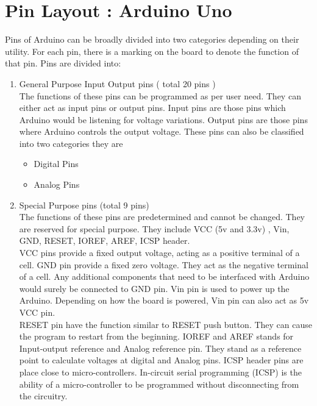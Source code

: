 \section{Pin Layout : Arduino Uno}
\par Pins of Arduino can be broadly divided into two categories depending on their utility. For each pin, there is a marking on the board to denote the function of that pin. Pins are divided into:
\begin{enumerate}
    \item General Purpose Input Output pins ( total 20 pins ) \vspace{1.5mm} \\ 
    The functions of these pins can be programmed as per user need. They can either act as input pins or output pins. Input pins are those pins which Arduino would be listening for voltage variations. Output pins are those pins where Arduino controls the output voltage. These pins can also be classified into two categories they are 
    \begin{itemize}
        \item Digital Pins
        \item Analog Pins
    \end{itemize}
    \item Special Purpose pins (total 9 pins)    \vspace{1.5mm} \\
    The functions of these pins are predetermined and cannot be changed. They are reserved for special purpose. They include VCC (5v and 3.3v) , Vin, GND, RESET, IOREF, AREF, ICSP header. \\
    VCC pins provide a fixed output voltage, acting as a positive terminal of a cell. GND pin provide a fixed zero voltage. They act as the negative terminal of a cell. Any additional components that need to be interfaced with Arduino would surely be connected to GND pin. Vin pin is used to power up the Arduino. Depending on how the board is powered, Vin pin can also act as 5v VCC pin.\\
    RESET pin have the function similar to RESET push button. They can cause the program to restart from the beginning. IOREF and AREF stands for Input-output reference and Analog reference pin. They stand as a reference point to calculate voltages at digital and Analog pins. ICSP header pins are place close to micro-controllers. In-circuit serial programming (ICSP) is the ability of a micro-controller to be programmed without disconnecting from the circuitry.
\end{enumerate}

